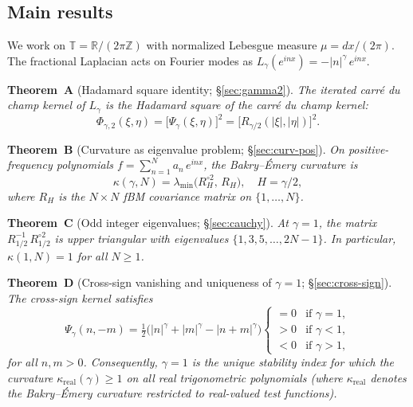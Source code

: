 \documentclass[11pt,a4paper]{article}
\theoremstyle{plain}
\theoremstyle{definition}
\theoremstyle{remark}
\newcommand{\R}{\mathbb{R}}
\newcommand{\Z}{\mathbb{Z}}
\newcommand{\T}{\mathbb{T}}
\begin{document}
\subsection{Main results}

We work on $\T = \R/(2\pi\Z)$ with normalized Lebesgue measure
$\mu = dx/(2\pi)$. The fractional Laplacian acts on Fourier modes as
$L_\gamma(e^{inx}) = -|n|^\gamma\,e^{inx}$.

\medskip\noindent
\textbf{Theorem~A} (Hadamard square identity; \S\ref{sec:gamma2}).
\emph{The iterated carr\'e du champ kernel of $L_\gamma$ is the
Hadamard square of the carr\'e du champ kernel:
\begin{equation}\label{eq:intro-A}
  \Phi_{\gamma,2}(\xi,\eta)
  = \bigl[\Psi_\gamma(\xi,\eta)\bigr]^2
  = \bigl[R_{\gamma/2}(|\xi|,|\eta|)\bigr]^2.
\end{equation}}

\medskip\noindent
\textbf{Theorem~B} (Curvature as eigenvalue problem; \S\ref{sec:curv-pos}).
\emph{On positive-frequency polynomials $f = \sum_{n=1}^N a_n\,e^{inx}$,
the Bakry--\'Emery curvature is
\begin{equation}\label{eq:intro-B}
  \kappa(\gamma, N) = \lambda_{\min}\!\bigl(R_H^{\circ 2},\, R_H\bigr),
  \quad H = \gamma/2,
\end{equation}
where $R_H$ is the $N \times N$ fBM covariance matrix on $\{1,\ldots,N\}$.}

\medskip\noindent
\textbf{Theorem~C} (Odd integer eigenvalues; \S\ref{sec:cauchy}).
\emph{At $\gamma = 1$, the matrix $R_{1/2}^{-1}\,R_{1/2}^{\circ 2}$ is
upper triangular with eigenvalues $\{1, 3, 5, \ldots, 2N-1\}$.
In particular, $\kappa(1,N) = 1$ for all $N \geq 1$.}

\medskip\noindent
\textbf{Theorem~D} (Cross-sign vanishing and uniqueness of $\gamma=1$; \S\ref{sec:cross-sign}).
\emph{The cross-sign kernel satisfies
\begin{equation}\label{eq:intro-D}
  \Psi_\gamma(n,-m) = \tfrac{1}{2}\bigl(|n|^\gamma + |m|^\gamma
  - |n+m|^\gamma\bigr)
  \begin{cases}
    = 0 & \text{if } \gamma = 1, \\
    > 0 & \text{if } \gamma < 1, \\
    < 0 & \text{if } \gamma > 1,
  \end{cases}
\end{equation}
for all $n,m > 0$. Consequently, $\gamma = 1$ is the unique stability
index for which the curvature
$\kappa_{\mathrm{real}}(\gamma) \geq 1$ on all real
trigonometric polynomials (where $\kappa_{\mathrm{real}}$ denotes the
Bakry--\'Emery curvature restricted to real-valued test functions).}
\end{document}
